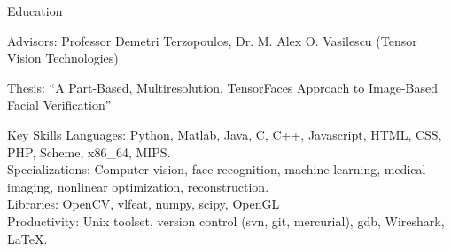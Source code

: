 \documentclass{resume}
\begin{document}
\maketitle
\thispagestyle{empty} %

\vspace{-0.5em}


\vspace{-0.5em}

\begin{component}{Education}

    \hspace{1em} Advisors: Professor Demetri Terzopoulos, Dr. M. Alex O. Vasilescu (Tensor Vision Technologies)

    \hspace{1em} Thesis: ``{A Part-Based, Multiresolution, TensorFaces Approach to Image-Based Facial Verification}''
    
\end{component}

\vspace{-0.25em}

\begin{component}{Key Skills}
		Languages: Python, Matlab, Java, C, C++, Javascript, HTML, CSS, PHP, Scheme, x86\_64, MIPS.\\
        Specializations: Computer vision, face recognition, machine learning, medical imaging, nonlinear optimization, reconstruction.\\
		Libraries: OpenCV, vlfeat, numpy, scipy, OpenGL \\
		Productivity: Unix toolset, version control (svn, git, mercurial), gdb, Wireshark, LaTeX.
\end{component}

\vspace{-0.25em}
\end{document}
